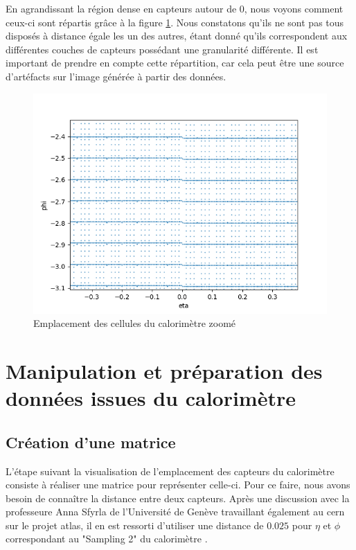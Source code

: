 \break

En agrandissant la région dense en capteurs autour de $0$, nous voyons comment ceux-ci sont répartis grâce à la figure \ref{fig:calocells_location_eta_reduced_zoomed_in}. Nous constatons qu'ils ne sont pas tous disposés à distance égale les un des autres, étant donné qu'ils correspondent aux différentes couches de capteurs possédant une granularité différente. Il est important de prendre en compte cette répartition, car cela peut être une source d'artéfacts sur l'image générée à partir des données.

\begin{figure}[hbt!]
    \centering
    \includegraphics[scale=0.7]{Figures/dataset/calo_cells_zoomed_in.png}
    \caption{Emplacement des cellules du calorimètre zoomé}
    \label{fig:calocells_location_eta_reduced_zoomed_in}
\end{figure}

\break

\section{Manipulation et préparation des données issues du calorimètre}

\subsection{Création d'une matrice}

L'étape suivant la visualisation de l'emplacement des capteurs du calorimètre consiste à réaliser une matrice pour représenter celle-ci. Pour ce faire, nous avons besoin de connaître la distance entre deux capteurs. Après une discussion avec la professeure Anna Sfyrla de l'Université de Genève travaillant également au \acrshort{cern} sur le projet \acrshort{atlas}, il en est ressorti d'utiliser une distance de $0.025$ pour $\eta$ et $\phi$ correspondant au "Sampling 2" du calorimètre \cite{noauthor_atlas_1996}.

